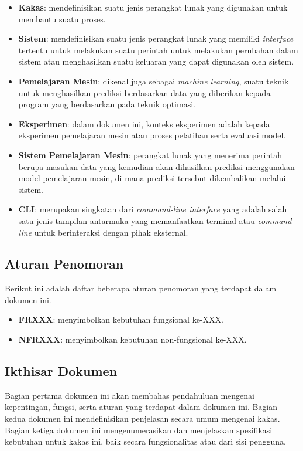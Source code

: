 \begin{itemize}
    \item \textbf{Kakas}: mendefinisikan suatu jenis perangkat lunak yang digunakan untuk membantu suatu proses.
    \item \textbf{Sistem}: mendefinisikan suatu jenis perangkat lunak yang memiliki \textit{interface} tertentu untuk melakukan suatu perintah untuk melakukan perubahan dalam sistem atau menghasilkan suatu keluaran yang dapat digunakan oleh sistem.
    \item \textbf{Pemelajaran Mesin}: dikenal juga sebagai \textit{machine learning}, suatu teknik untuk menghasilkan prediksi berdasarkan data yang diberikan kepada program yang berdasarkan pada teknik optimasi.
    \item \textbf{Eksperimen}: dalam dokumen ini, konteks eksperimen adalah kepada eksperimen pemelajaran mesin atau proses pelatihan serta evaluasi model.
    \item \textbf{Sistem Pemelajaran Mesin}: perangkat lunak yang menerima perintah berupa masukan data yang kemudian akan dihasilkan prediksi menggunakan model pemelajaran mesin, di mana prediksi tersebut dikembalikan melalui sistem.
    \item \textbf{CLI}: merupakan singkatan dari \textit{command-line interface} yang adalah salah satu jenis tampilan antarmuka yang memanfaatkan terminal atau \textit{command line} untuk berinteraksi dengan pihak eksternal.
\end{itemize}

\subsection{Aturan Penomoran}

Berikut ini adalah daftar beberapa aturan penomoran yang terdapat dalam dokumen ini.
\begin{itemize}
    \item \textbf{FRXXX}: menyimbolkan kebutuhan fungsional ke-XXX.
    \item \textbf{NFRXXX}: menyimbolkan kebutuhan non-fungsional ke-XXX.
\end{itemize}

\subsection{Ikthisar Dokumen}

Bagian pertama dokumen ini akan membahas pendahuluan mengenai kepentingan, fungsi, serta aturan yang terdapat dalam dokumen ini.
Bagian kedua dokumen ini mendefinisikan penjelasan secara umum mengenai kakas.
Bagian ketiga dokumen ini mengenumerasikan dan menjelaskan spesifikasi kebutuhan untuk kakas ini, baik secara fungsionalitas atau dari sisi pengguna.

